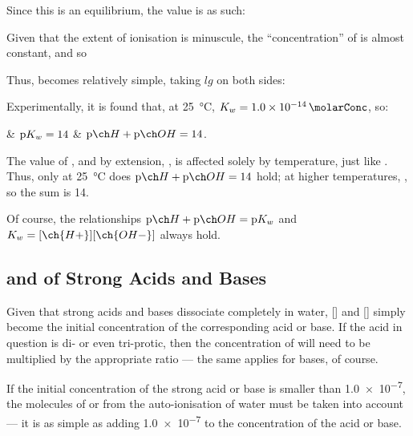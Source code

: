 			Since this is an equilibrium, the \Kc{} value is as such:

			\mathdiagram{
				\[ K_{c} = \frac{[\ch{H+}][\ch{OH-}]}{[\ch{H2O}]} \]
			}

			Given that the extent of ionisation is minuscule, the \enquote{concentration} of  is almost constant, and so

			\mathdiagram{
				\[ \MKw = K_{c} \times [\ch{H2O}] = [\ch{H+}][\ch{OH-}] \]
			}

			Thus, \pKw{} becomes relatively simple, taking $lg$ on both sides:

			\mathdiagram{
				$\MpKw = \MpH + \MpOH$
			}

			Experimentally, it is found that, at \SI{25}{\celsius}, $\MKw = \SI{1.0e-14}{\molarConc}$, so:
			\begin{bulletlist}
				& $\mathrm{p}K_{w} = 14$
				& $\MpH + \MpOH = 14$.
			\end{bulletlist}

			The value of \Kw{}, and by extension, \pKw{}, is affected solely by temperature, just like \Kc{}. Thus, only at \SI{25}{\celsius}
			does $\MpH + \MpOH = 14$ hold; at higher temperatures, \Kw{} , so the sum is  \num{14}.

			Of course, the relationships $\MpH + \MpOH = \MpKw$ and $\MKw = [\ch{H+}][\ch{OH-}]$ always hold.


		\subsection{\texorpdfstring{\pH{}}{pH} and \texorpdfstring{\pOH{}}{pOH} of Strong Acids and Bases}

			Given that strong acids and bases dissociate completely in water, [] and [] simply become the initial concentration
			of the corresponding acid or base. If the acid in question is di- or even tri-protic, then the concentration of  will need
			to be multiplied by the appropriate ratio --- the same applies for bases, of course.

			If the initial concentration of the strong acid or base is smaller than \SI{1.0e-7}{\molarConc},
			the molecules of  or  from the auto-ionisation of water must be taken into account --- it is as simple as adding
			\num{1.0e-7} to the concentration of the acid or base.


